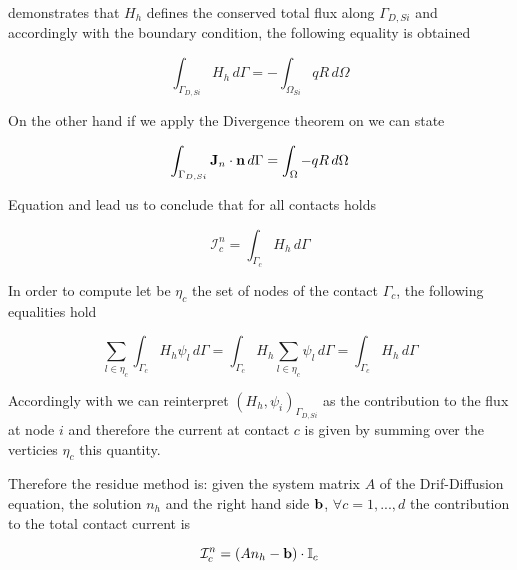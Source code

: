 \cite{GalerkMethConsHughes} demonstrates that $H_h$ defines the conserved total flux along $\Gamma_{D,Si}$ and accordingly with the boundary condition, the following equality is obtained

\begin{equation}
\label{eq: conservative flux}
\int_{\Gamma_{D,Si}} H_h \, d\Gamma = - \int_{\Omega_{Si}} qR \, d \Omega
\end{equation}


On the other hand if we apply the Divergence theorem on  we can state 

\begin{equation}
\label{eq: lec divergence theor}
\int_{\Gamma_{D,Si}} \mathbf{J}_n \cdot \mathbf{n} \, d\Gamma = \int_{\Omega} - qR \, d\Omega
\end{equation}

Equation  and   lead us to conclude that for all contacts holds

\begin{equation}
\label{eq: flux current formula}
\mathcal{I}_c^n = \int_{\Gamma_c} H_h \, d\Gamma
\end{equation}

In order to compute  let be $\eta_{c}$ the set of nodes of the contact $\Gamma_c$, the following equalities hold

\begin{equation}
\label{eq: equalities integrals}
\sum_{l \in \eta_c} \int_{\Gamma_c} H_h \psi_l \, d\Gamma 
=  \int_{\Gamma_c} H_h \sum_{l \in \eta_{c}} \psi_l \,d\Gamma 
= \int_{\Gamma_c} H_h \, d\Gamma
\end{equation}


Accordingly with   we can reinterpret $(H_h,\psi_i)_{\Gamma_{D,Si}}$ as the contribution to the flux at node $i$ and therefore the current at contact $c$ is given by summing over the verticies $\eta_{c}$ this quantity.

Therefore the residue method is:
given the system matrix $A$ of the Drif-Diffusion equation, the solution $n_h$ and the right hand side $\mathbf{b}$, $\forall c = 1,...,d$ the contribution to the total contact current is

\begin{equation}
\mathcal{I}_c^n = (An_h-\mathbf{b})\cdot \mathbb{I}_c
\end{equation} 


